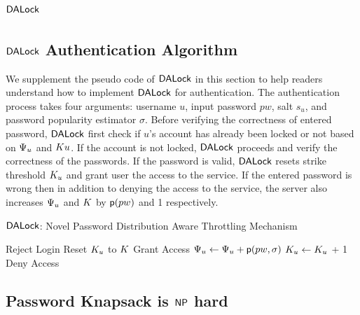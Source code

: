 \clearpage
\appendix
\section{$\mathsf{DALock}$}



\subsection{$\mathsf{DALock}$ Authentication Algorithm}
We supplement the pseudo code of $\mathsf{DALock}$ in this section to help readers understand how to implement $\mathsf{DALock}$ for authentication. The authentication process takes four arguments: username $u$, input password $pw$, salt $s_u$, and password popularity estimator $\sigma$. Before verifying the correctness of entered password, $\mathsf{DALock}$ first check if $u$'s account has already been locked or not based on $\Psi_{u}$ and $K{u}$. If the account is not locked, $\mathsf{DALock}$ proceeds and verify the correctness of the passwords. If the password is valid, $\mathsf{DALock}$ resets strike threshold $K_{u}$ and grant user the access to the service. If the entered password is wrong then in addition to denying the access to the service, the server also increases $\Psi_{u}$ and $K$ by $\textsf{p}(pw)$ and 1 respectively. 


\begin{algorithm}[!htb]
	\caption{\textbf{$\mathsf{DALock}$}: Novel Password Distribution Aware Throttling Mechanism }\label{algorithm:DALock}
	\begin{algorithmic}[1]
		\State Reject Login
		\EndIf
		\State Reset $K_{u}$ to $K$ 
		\State Grant Access
		\Else
		\State $\Psi_{u} \leftarrow \Psi_{u} + \textsf{p}(pw,\sigma)$
		\State $K_{u} \leftarrow K_{u}$ + 1
		\State Deny Access
		\EndIf
		\EndFunction
	\end{algorithmic}
\end{algorithm} 
\subsection{Password Knapsack is $\mathsf{NP}$ hard}




